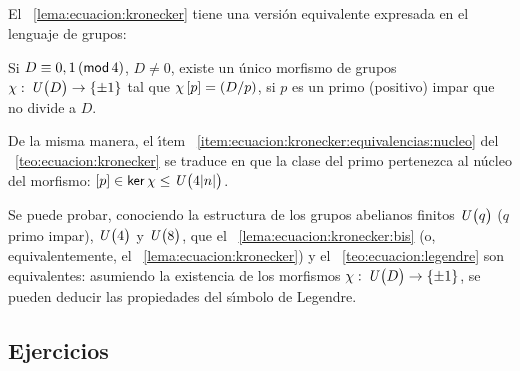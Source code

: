 \subsection*{\appendixname}
El \lemaname~\ref{lema:ecuacion:kronecker} tiene una versi\'on equivalente
expresada en el lenguaje de grupos:
\begin{lemaEcuacion}\label{lema:ecuacion:kronecker:bis}
	Si $D\equiv 0,1\tmodulo[4]$, $D\neq 0$, existe un \'unico morfismo
	de grupos $\chi:\,\Unidadesmod[D]\rightarrow\cuadratico$
	tal que $\chi\clase p=\tlegendre D{p}$, si $p$ es un primo (positivo)
	impar que no divide a $D$.
\end{lemaEcuacion}
\noindent
De la misma manera, el \'{\i}tem~%
\eqref{item:ecuacion:kronecker:equivalencias:nucleo} del
\teoname~\ref{teo:ecuacion:kronecker} se traduce en que la clase del primo
pertenezca al n\'ucleo del morfismo:
$\clase p\in\ker\,\chi\leq\Unidadesmod[4|n|]$.

\begin{obsEcuacion}\label{obs:ecuacion:kronecker:bis}
	Se puede probar, conociendo la estructura de los grupos abelianos
	finitos $\Unidadesmod[q]$ ($q$ primo impar), $\Unidadesmod[4]$ y
	$\Unidadesmod[8]$, que el \lemaname~\ref{lema:ecuacion:kronecker:bis}
	(o, equivalentemente, el \lemaname~\ref{lema:ecuacion:kronecker}) y
	el \teoname~\ref{teo:ecuacion:legendre} son equivalentes: asumiendo
	la existencia de los morfismos
	$\chi:\,\Unidadesmod[D]\rightarrow\cuadratico$, se pueden deducir
	las propiedades del s\'{\i}mbolo de Legendre.
\end{obsEcuacion}

\subsection*{Ejercicios}


